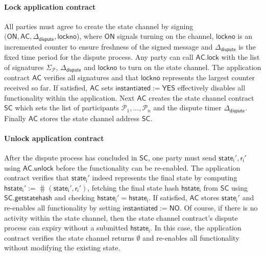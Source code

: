 \documentclass{llncs}
\newcommand{\instantiated}{\mathsf{instantiated}}
\newcommand{\instantiatedno}{\mathsf{NO}}
\newcommand{\instantiatedyes}{\mathsf{YES}}
\newcommand{\chanon}{\mathsf{ON}}
\newcommand{\hstatei}{\mathsf{hstate}_{\monotoniccounter}}
\newcommand{\monotoniccounter}{\mathsf{i}}
\newcommand{\stateinfoi}{\mathsf{state}_{\mathsf{i}}}
\newcommand{\participant}{\mathcal{P}}
\newcommand{\rani}{\mathsf{r}_{\mathsf{i}}}
\newcommand{\statechannel}{\mathsf{SC}}
\newcommand{\statechannelgetcommitment}{\mathsf{SC}.\mathsf{getstatehash}}
\newcommand{\appcontract}{\mathsf{AC}}
\newcommand{\applock}{\mathsf{AC.lock}}
\newcommand{\appunlock}{\mathsf{AC.unlock}}
\newcommand{\timerdispute}{\mathsf{\Delta}_{\mathsf{dispute}}}
\begin{document}


 
\paragraph{Lock application contract} All parties must agree to create the state channel by signing $(\chanon, \appcontract, \timerdispute, \mathsf{lockno}$), where $\chanon$ signals turning on the channel, $\mathsf{lockno}$ is an incremented counter to ensure freshness of the signed message and $\timerdispute$ is the fixed time period for the dispute process. 
Any party can call $\applock$ with the list of signatures $\Sigma_{\participant}$, $\timerdispute$ and $\mathsf{lockno}$ to turn on the state channel. 
The application contract $\appcontract$ verifies all signatures and that $\mathsf{lockno}$ represents the largest counter received so far.
If satisfied, $\appcontract$ sets  $\instantiated := \instantiatedyes$ effectively disables all functionality within the application.
Next $\appcontract$ creates the state channel contract $\statechannel$ which sets the list of participants $\participant_{1},...,\participant_{n}$ and the dispute timer $\timerdispute$. 
Finally $\appcontract$ stores the state channel address $\statechannel$. 
 

\paragraph{Unlock application contract}

After the dispute process has concluded in $\statechannel$, one party must send  $\stateinfoi',\rani'$ using $\appunlock$ before the functionality can be re-enabled.
The application contract verifies that $\stateinfoi'$  indeed represents the final state by computing $\hstatei' := \hash(\stateinfoi', \rani')$, fetching the final state hash $\hstatei$ from $\statechannel$ using $\statechannelgetcommitment$ and checking  $\hstatei' = \hstatei$. 
If satisfied, $\appcontract$ stores $\stateinfoi'$ and re-enables all functionality by setting $\instantiated :=  \instantiatedno$. 
Of course, if there is no activity within the state channel, then the state channel contract's dispute process can expiry without a submitted $\hstatei$.
In this case, the application contract verifies the state channel returns $\emptyset$ and re-enables all functionality without modifying the existing state. 
\end{document}

